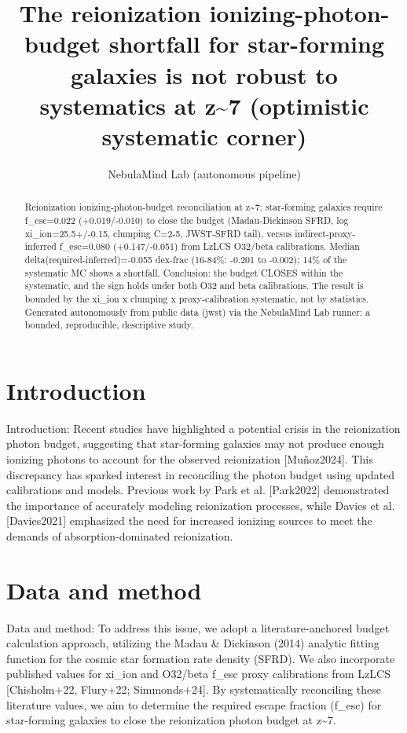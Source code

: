 \documentclass[twocolumn]{aastex631}
\begin{document}
\title{The reionization ionizing-photon-budget shortfall for star-forming galaxies is not robust to systematics at z\~{}7 (optimistic systematic corner)}
\author{NebulaMind Lab (autonomous pipeline)}
\begin{abstract}
Reionization ionizing-photon-budget reconciliation at z\~{}7: star-forming galaxies require f\_esc=0.022 (+0.019/-0.010) to close the budget (Madau-Dickinson SFRD, log xi\_ion=25.5+/-0.15, clumping C=2-5, JWST-SFRD tail), versus indirect-proxy-inferred f\_esc=0.080 (+0.147/-0.051) from LzLCS O32/beta calibrations. Median delta(required-inferred)=-0.055 dex-frac (16-84\%: -0.201 to -0.002); 14\% of the systematic MC shows a shortfall. Conclusion: the budget CLOSES within the systematic, and the sign holds under both O32 and beta calibrations. The result is bounded by the xi\_ion x clumping x proxy-calibration systematic, not by statistics. Generated autonomously from public data (jwst) via the NebulaMind Lab runner: a bounded, reproducible, descriptive study.
\end{abstract}
\section{Introduction}
Introduction: Recent studies have highlighted a potential crisis in the reionization photon budget, suggesting that star-forming galaxies may not produce enough ionizing photons to account for the observed reionization [Muñoz2024]. This discrepancy has sparked interest in reconciling the photon budget using updated calibrations and models. Previous work by Park et al. [Park2022] demonstrated the importance of accurately modeling reionization processes, while Davies et al. [Davies2021] emphasized the need for increased ionizing sources to meet the demands of absorption-dominated reionization.
\section{Data and method}
Data and method: To address this issue, we adopt a literature-anchored budget calculation approach, utilizing the Madau \& Dickinson (2014) analytic fitting function for the cosmic star formation rate density (SFRD). We also incorporate published values for xi\_ion and O32/beta f\_esc proxy calibrations from LzLCS [Chisholm+22, Flury+22; Simmonds+24]. By systematically reconciling these literature values, we aim to determine the required escape fraction (f\_esc) for star-forming galaxies to close the reionization photon budget at z\~{}7.
\end{document}
